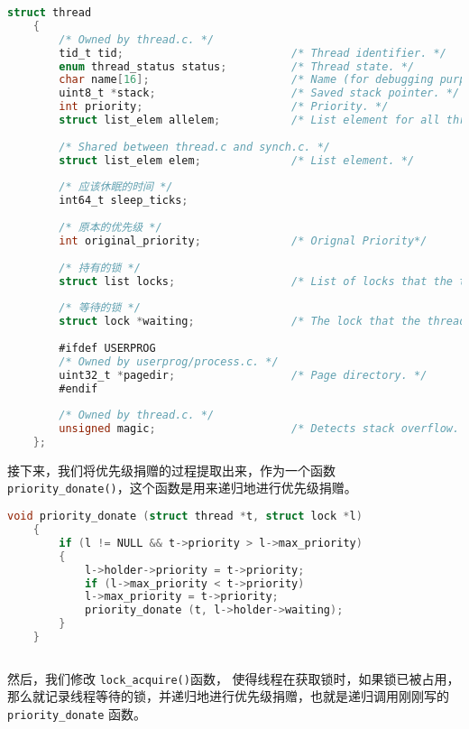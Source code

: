 \documentclass{article}
\begin{document}
	\begin{lstlisting}[language=C, title=修改后的线程结构体]
    struct thread
    {
    	/* Owned by thread.c. */
    	tid_t tid;                          /* Thread identifier. */
    	enum thread_status status;          /* Thread state. */
    	char name[16];                      /* Name (for debugging purposes). */
    	uint8_t *stack;                     /* Saved stack pointer. */
    	int priority;                       /* Priority. */
    	struct list_elem allelem;           /* List element for all threads list. */
    	
    	/* Shared between thread.c and synch.c. */
    	struct list_elem elem;              /* List element. */
    	
    	/* 应该休眠的时间 */
    	int64_t sleep_ticks;
    	
    	/* 原本的优先级 */
    	int original_priority;              /* Orignal Priority*/
    	
    	/* 持有的锁 */
    	struct list locks;                  /* List of locks that the thread is holding. */
    	
    	/* 等待的锁 */
    	struct lock *waiting;               /* The lock that the thread is waiting for. */
    	
    	#ifdef USERPROG
    	/* Owned by userprog/process.c. */
    	uint32_t *pagedir;                  /* Page directory. */
    	#endif
    	
    	/* Owned by thread.c. */
    	unsigned magic;                     /* Detects stack overflow. */
    };
	\end{lstlisting}
	
	接下来，我们将优先级捐赠的过程提取出来，作为一个函数 \texttt{priority\_donate()}，这个函数是用来递归地进行优先级捐赠。
	
	\begin{lstlisting}[language=C, title=优先级捐赠函数]
    void priority_donate (struct thread *t, struct lock *l)
    {
    	if (l != NULL && t->priority > l->max_priority)
    	{
    		l->holder->priority = t->priority;
    		if (l->max_priority < t->priority)
    		l->max_priority = t->priority;
    		priority_donate (t, l->holder->waiting);
    	}
    }
		
	\end{lstlisting}
	
	然后，我们修改 \texttt{lock\_acquire()}函数， 使得线程在获取锁时，如果锁已被占用，那么就记录线程等待的锁，并递归地进行优先级捐赠，也就是递归调用刚刚写的 \texttt{priority\_donate} 函数。
	
\end{document}
